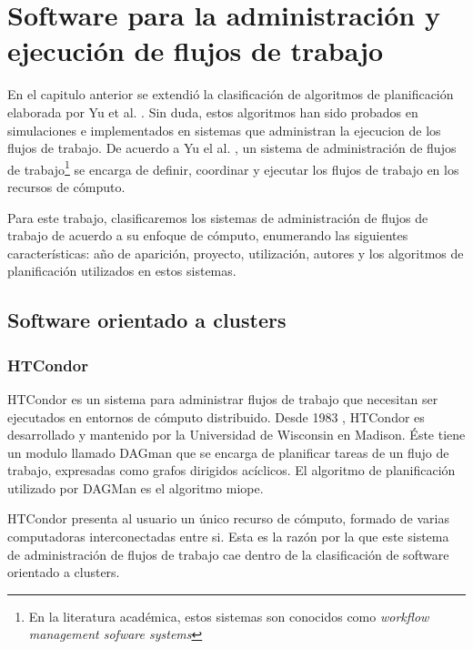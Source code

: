 \chapter{Software para la administración y ejecución de flujos de trabajo}

En el capitulo anterior se extendió la clasificación de algoritmos de planificación elaborada por Yu et al. \cite{yu2008workflow}. Sin duda, estos algoritmos han sido probados en simulaciones e implementados en sistemas que administran la ejecucion de los flujos de trabajo. De acuerdo a Yu el al. \cite{yu2008workflow}, un sistema de administración de flujos de trabajo\footnote{En la literatura académica, estos sistemas son conocidos como \emph{workflow management sofware systems}} se encarga de definir, coordinar y ejecutar los flujos de trabajo en los recursos de cómputo.

Para este trabajo, clasificaremos los sistemas de administración de flujos de trabajo de acuerdo a su enfoque de cómputo, enumerando las siguientes características: año de aparición, proyecto, utilización, autores y los algoritmos de planificación utilizados en estos sistemas.

\section{Software orientado a clusters}


\subsection{HTCondor}

HTCondor \cite{condor-practice} es un sistema para administrar flujos de trabajo que necesitan ser ejecutados en entornos de cómputo distribuido. Desde 1983 \cite{htcondor2014webpage}, HTCondor es desarrollado y mantenido por la Universidad de Wisconsin en Madison. Éste tiene un modulo llamado DAGman que se encarga de planificar tareas de un flujo de trabajo, expresadas como grafos dirigidos acíclicos. El algoritmo de planificación utilizado por DAGMan es el algoritmo miope. 

HTCondor presenta al usuario un único recurso de cómputo, formado de varias computadoras interconectadas entre si. Esta es la razón por la que este sistema de administración de flujos de trabajo cae dentro de la clasificación de software orientado a clusters.

